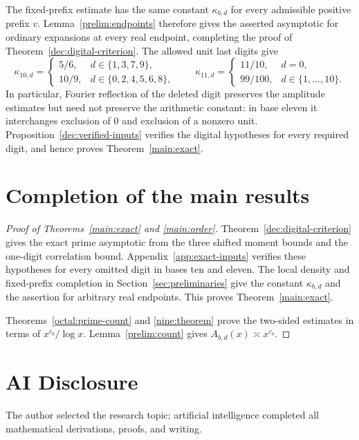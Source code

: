 \documentclass[11pt,a4paper]{article}
\theoremstyle{paperplain}
\numberwithin{equation}{section}
\begin{document}
The fixed-prefix estimate has the same constant $\kappa_{b,d}$
for every admissible positive prefix $v$. Lemma~\ref{prelim:endpoints}
therefore gives the asserted asymptotic for ordinary expansions at every
real endpoint, completing the proof of
Theorem~\ref{dec:digital-criterion}. The allowed unit last digits give
\[
 \kappa_{10,d}=
 \begin{cases}
 5/6,&d\in\{1,3,7,9\},\\
 10/9,&d\in\{0,2,4,5,6,8\},
 \end{cases}
 \qquad
 \kappa_{11,d}=
 \begin{cases}
 11/10,&d=0,\\
 99/100,&d\in\{1,\ldots,10\}.
 \end{cases}
\]
In particular, Fourier reflection of the deleted digit preserves the
amplitude estimates but need not preserve the arithmetic constant:
in base eleven it interchanges exclusion of $0$ and exclusion of a
nonzero unit. Proposition~\ref{dec:verified-inputs} verifies the digital
hypotheses for every required digit, and hence proves
Theorem~\ref{main:exact}.

\section{Completion of the main results}
\label{sec:completion}

\begin{proof}[Proof of Theorems~\ref{main:exact} and \ref{main:order}]
Theorem~\ref{dec:digital-criterion} gives the exact prime asymptotic
from the three shifted moment bounds and the one-digit correlation
bound. Appendix~\ref{app:exact-inputs} verifies these hypotheses for
every omitted digit in bases ten and eleven. The local density and
fixed-prefix completion in Section~\ref{sec:preliminaries} give
the constant $\kappa_{b,d}$ and the assertion for arbitrary real
endpoints. This proves Theorem~\ref{main:exact}.

Theorems~\ref{octal:prime-count} and \ref{nine:theorem} prove the
two-sided estimates in terms of $x^{c_b}/\log x$.
Lemma~\ref{prelim:count} gives $A_{b,d}(x)\asymp x^{c_b}$.
\end{proof}

\section*{AI Disclosure}
The author selected the research topic; artificial intelligence completed all mathematical derivations, proofs, and writing.
\end{document}
